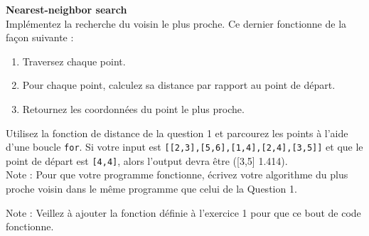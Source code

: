 \begin{Exercice}[10 minutes]\textbf{Nearest-neighbor search}\\

Implémentez la recherche du voisin le plus proche. Ce dernier fonctionne de la façon suivante :
\begin{enumerate}
    \item Traversez chaque point.
    \item Pour chaque point, calculez sa distance par rapport au point de départ.
    \item Retournez les coordonnées du point le plus proche.
\end{enumerate}
    
\begin{conseil}
    Utilisez la fonction de distance de la question 1 et parcourez les points à l'aide d'une boucle \lstinline{for}. Si votre input est \lstinline{[[2,3],[5,6],[1,4],[2,4],[3,5]]} et que le point de départ est \lstinline{[4,4]}, alors l'output devra être ([3,5] 1.414).\\
    
    Note : Pour que votre programme fonctionne, écrivez votre algorithme du plus proche voisin dans le même programme que celui de la Question 1.
\end{conseil}
\begin{solution}
    Note : Veillez à ajouter la fonction définie à l'exercice 1 pour que ce bout de code fonctionne.
    
\end{solution}
\end{Exercice}

